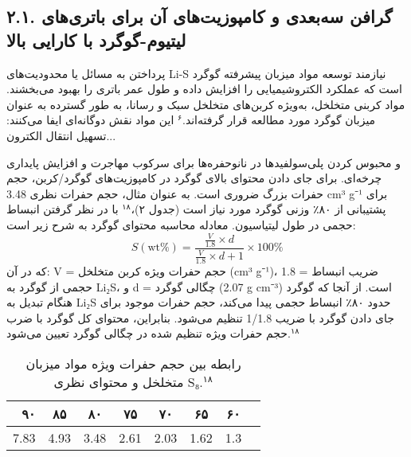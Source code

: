 \documentclass[12pt,a4paper,twocolumn]{article} %
\newcommand{\persian}[1]{\textfarsi{#1}}
\newcommand{\english}[1]{\textenglish{#1}}
\newcommand{\farsibold}[1]{{\farsifontbold{#1}}}
\begin{document}
\subsection*{\persian{۲.۱. گرافن سه‌بعدی و کامپوزیت‌های آن برای باتری‌های لیتیوم-گوگرد با کارایی بالا}}
\persian{
پرداختن به مسائل یا محدودیت‌های \english{Li-S} نیازمند توسعه مواد میزبان پیشرفته گوگرد است که عملکرد الکتروشیمیایی را افزایش داده و طول عمر باتری را بهبود می‌بخشند. مواد کربنی متخلخل، به‌ویژه کربن‌های متخلخل سبک و رسانا، به طور گسترده به عنوان میزبان گوگرد مورد مطالعه قرار گرفته‌اند.$^۶$ این مواد نقش دوگانه‌ای ایفا می‌کنند: تسهیل انتقال الکترون...
}


\persian{
و محبوس کردن پلی‌سولفیدها در نانوحفره‌ها برای سرکوب مهاجرت و افزایش پایداری چرخه‌ای. برای جای دادن محتوای بالای گوگرد در کامپوزیت‌های گوگرد/کربن، حجم حفرات بزرگ ضروری است. به عنوان مثال، حجم حفرات نظری \english{3.48 cm³ g⁻¹} برای پشتیبانی از ۸۰٪ وزنی گوگرد مورد نیاز است (جدول ۲)،$^{۱۸}$ با در نظر گرفتن انبساط حجمی در طول لیتیاسیون.
}
\persian{
معادله محاسبه محتوای گوگرد به شرح زیر است:
}
\begin{equation*}
S(\text{wt\%}) = \frac{\frac{V}{1.8} \times d}{\frac{V}{1.8} \times d + 1} \times 100\%
\end{equation*}
\persian{
که در آن: \english{V} = حجم حفرات ویژه کربن متخلخل (\english{cm³ g⁻¹})، \english{1.8} = ضریب انبساط حجمی از گوگرد به \english{Li₂S}، و \english{d} = چگالی گوگرد (\english{2.07 g cm⁻³}) است.
از آنجا که گوگرد هنگام تبدیل به \english{Li₂S} حدود ۸۰٪ انبساط حجمی پیدا می‌کند، حجم حفرات موجود برای جای دادن گوگرد با ضریب \english{1/1.8} تنظیم می‌شود. بنابراین، محتوای کل گوگرد با ضرب حجم حفرات ویژه تنظیم شده در چگالی گوگرد تعیین می‌شود.$^{۱۸}$
}

\begin{table}[h]
    \centering
    \caption{\persian{\farsibold{جدول ۲.} رابطه بین حجم حفرات ویژه مواد میزبان متخلخل و محتوای نظری \english{S₈}.$^{۱۸}$}}
    \label{tab:pore_volume}
    \begin{tabular}{rccccccc}
        \toprule
        \persian{۹۰} & \persian{۸۵} & \persian{۸۰} & \persian{۷۵} & \persian{۷۰} & \persian{۶۵} & \persian{۶۰} & \farsibold{محتوای گوگرد (درصد وزنی)} \\
        \hline
        \english{7.83} & \english{4.93} & \english{3.48} & \english{2.61} & \english{2.03} & \english{1.62} & \english{1.3} & \farsibold{حجم حفرات ویژه (\english{cm³ g⁻¹})} \\
        \bottomrule
    \end{tabular}
\end{table}
\end{document}
